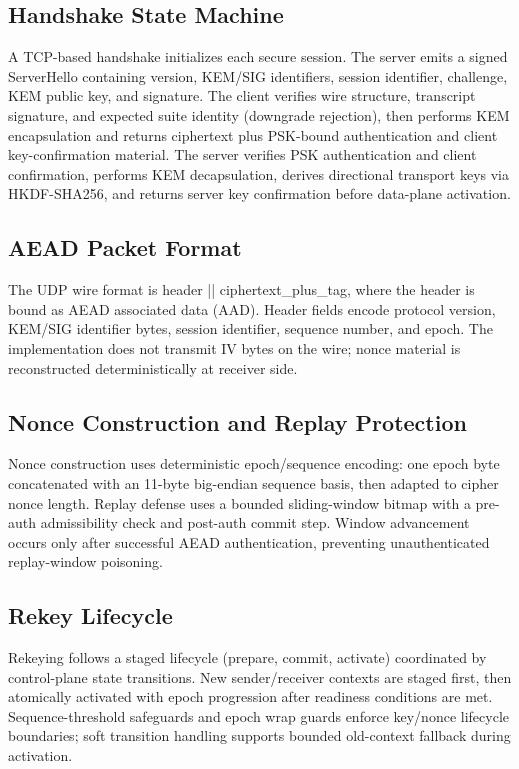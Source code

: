 \documentclass[conference]{IEEEtran}
\begin{document}
\subsection{Handshake State Machine}
A TCP-based handshake initializes each secure session. The server emits a signed ServerHello containing version, KEM/SIG identifiers, session identifier, challenge, KEM public key, and signature. The client verifies wire structure, transcript signature, and expected suite identity (downgrade rejection), then performs KEM encapsulation and returns ciphertext plus PSK-bound authentication and client key-confirmation material. The server verifies PSK authentication and client confirmation, performs KEM decapsulation, derives directional transport keys via HKDF-SHA256, and returns server key confirmation before data-plane activation.

\subsection{AEAD Packet Format}
The UDP wire format is header || ciphertext\_plus\_tag, where the header is bound as AEAD associated data (AAD). Header fields encode protocol version, KEM/SIG identifier bytes, session identifier, sequence number, and epoch. The implementation does not transmit IV bytes on the wire; nonce material is reconstructed deterministically at receiver side.

\subsection{Nonce Construction and Replay Protection}
Nonce construction uses deterministic epoch/sequence encoding: one epoch byte concatenated with an 11-byte big-endian sequence basis, then adapted to cipher nonce length. Replay defense uses a bounded sliding-window bitmap with a pre-auth admissibility check and post-auth commit step. Window advancement occurs only after successful AEAD authentication, preventing unauthenticated replay-window poisoning.

\subsection{Rekey Lifecycle}
Rekeying follows a staged lifecycle (prepare, commit, activate) coordinated by control-plane state transitions. New sender/receiver contexts are staged first, then atomically activated with epoch progression after readiness conditions are met. Sequence-threshold safeguards and epoch wrap guards enforce key/nonce lifecycle boundaries; soft transition handling supports bounded old-context fallback during activation.
\end{document}
